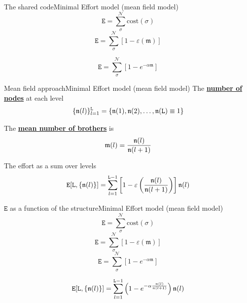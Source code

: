 \documentclass[11pt,svgnames]{beamer}
\newcommand{\Elle}{\mathtt L}
\newcommand{\Ee}{\mathtt E}
\newcommand{\enne}{\mathfrak n}
\newcommand{\Enne}{\mathcal N}
\newcommand{\emme}{\mathfrak m}
\newcommand{\elle}{\mathnormal l}
\begin{document}
\begin{frame}[t]{The shared code}{Minimal Effort model (mean field model)}
\[ \Ee = \sum_{\sigma}^{\Enne} \text{cost}(\sigma) \]
\[ \Ee = \sum_{\sigma}^{\Enne} \left[ 1 - \varepsilon(\emme) \right] \]
\begin{tcolorbox}[colframe=green]
\[ \Ee = \sum_{\sigma}^{\Enne} \left[1 - e^{-\alpha \emme} \right] \]
\end{tcolorbox}
\end{frame}

\begin{frame}[noframenumbering]{Mean field approach}{Minimal Effort model (mean field model)}
The \underline{\textbf{number of nodes}} at each level
\[ \{ \enne(\elle) \}_{\elle=1}^{\Elle} = \{ \enne(1), \enne(2), \dots, \enne(\Elle)\equiv 1\} \]

The \underline{\textbf{mean number of brothers}} is 
\[ \emme(\elle) = \frac{\enne(\elle)}{\enne(\elle+1)} \]

\vspace{0.5cm}
The effort as a sum over levels
\[ \Ee [\Elle,\{ \enne(\elle) \}] = \sum_{\elle=1}^{\Elle-1} \left [ 1 - \varepsilon \left ( \frac{\enne(\elle)}{\enne(\elle+1)} \right ) \right ] \enne(\elle) \]
 \end{frame}

\begin{frame}[t]{$\boldsymbol{\Ee}$ as a function of the structure}{Minimal Effort model (mean field model)}
\[ \Ee = \sum_{\sigma}^{\Enne} \text{cost}(\sigma) \]
\[ \Ee = \sum_{\sigma}^{\Enne} \left[ 1 - \varepsilon(\emme) \right]\]
\[ \Ee = \sum_{\sigma}^{\Enne} \left[ 1 - e^{-\alpha \emme} \right]\]
\begin{tcolorbox}[colframe=green]
\[\Ee [\Elle,\{ \enne(\elle) \}] = \sum_{\elle=1}^{\Elle-1} \left ( 1 - e^{- \alpha \frac{\enne(\elle)}{\enne(\elle+1)}} \right ) \enne(\elle)\]
\end{tcolorbox}
\end{frame}
\end{document}
